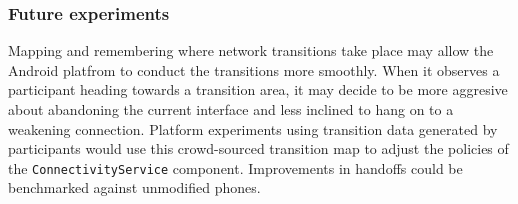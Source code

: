 \subsubsection{Future experiments}

Mapping and remembering where network transitions take place may allow the
Android platfrom to conduct the transitions more smoothly. When it observes a
participant heading towards a transition area, it may decide to be more
aggresive about abandoning the current interface and less inclined to hang on
to a weakening connection. Platform experiments using transition data
generated by \PhoneLab{} participants would use this crowd-sourced transition
map to adjust the policies of the \texttt{ConnectivityService} component.
Improvements in handoffs could be benchmarked against unmodified \PhoneLab{}
phones.
